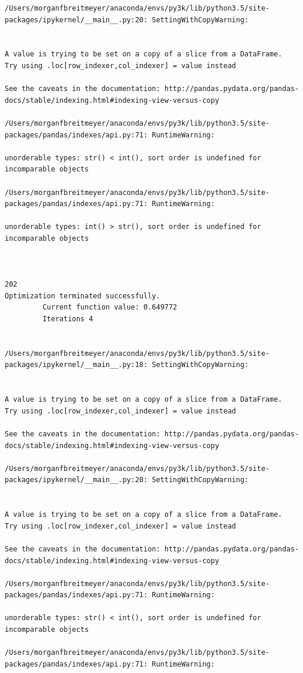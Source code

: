 \begin{lstlisting}
/Users/morganfbreitmeyer/anaconda/envs/py3k/lib/python3.5/site-packages/ipykernel/__main__.py:20: SettingWithCopyWarning:


A value is trying to be set on a copy of a slice from a DataFrame.
Try using .loc[row_indexer,col_indexer] = value instead

See the caveats in the documentation: http://pandas.pydata.org/pandas-docs/stable/indexing.html#indexing-view-versus-copy

/Users/morganfbreitmeyer/anaconda/envs/py3k/lib/python3.5/site-packages/pandas/indexes/api.py:71: RuntimeWarning:

unorderable types: str() < int(), sort order is undefined for incomparable objects

/Users/morganfbreitmeyer/anaconda/envs/py3k/lib/python3.5/site-packages/pandas/indexes/api.py:71: RuntimeWarning:

unorderable types: int() > str(), sort order is undefined for incomparable objects



202
Optimization terminated successfully.
         Current function value: 0.649772
         Iterations 4


/Users/morganfbreitmeyer/anaconda/envs/py3k/lib/python3.5/site-packages/ipykernel/__main__.py:18: SettingWithCopyWarning:


A value is trying to be set on a copy of a slice from a DataFrame.
Try using .loc[row_indexer,col_indexer] = value instead

See the caveats in the documentation: http://pandas.pydata.org/pandas-docs/stable/indexing.html#indexing-view-versus-copy

/Users/morganfbreitmeyer/anaconda/envs/py3k/lib/python3.5/site-packages/ipykernel/__main__.py:20: SettingWithCopyWarning:


A value is trying to be set on a copy of a slice from a DataFrame.
Try using .loc[row_indexer,col_indexer] = value instead

See the caveats in the documentation: http://pandas.pydata.org/pandas-docs/stable/indexing.html#indexing-view-versus-copy

/Users/morganfbreitmeyer/anaconda/envs/py3k/lib/python3.5/site-packages/pandas/indexes/api.py:71: RuntimeWarning:

unorderable types: str() < int(), sort order is undefined for incomparable objects

/Users/morganfbreitmeyer/anaconda/envs/py3k/lib/python3.5/site-packages/pandas/indexes/api.py:71: RuntimeWarning:


\end{lstlisting}
